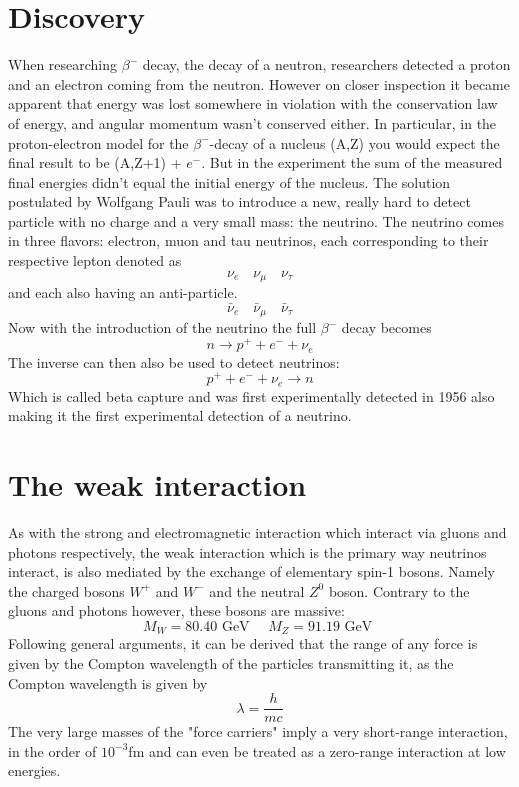 \section{Discovery}
When researching $\beta^-$ decay, the decay of a neutron, researchers
detected a proton and an electron coming from the neutron. However
on closer inspection it became apparent that energy was lost
somewhere in violation with the conservation law of energy, and
angular momentum wasn't conserved either\cite{Bilenky_2012}.  
In particular, in the proton-electron model for the $\beta^-$-decay
of a nucleus (A,Z) you would expect the final result to be (A,Z+1) + $e^-$.
But in the experiment the sum of the measured final energies
didn't equal the initial energy of the nucleus.
The solution postulated by
Wolfgang Pauli was to introduce a new, really hard to detect
particle with no charge and a very small mass: the neutrino.  The neutrino comes in three flavors:
electron, muon and tau neutrinos, each corresponding to their respective lepton denoted as
\begin{equation}
	\nu_e \quad \nu_\mu \quad \nu_\tau
\end{equation}
and each also having an anti-particle.
\begin{equation}
	\bar{\nu}_e \quad \bar{\nu}_\mu \quad \bar{\nu}_\tau
\end{equation}
Now with the introduction of the neutrino the full $\beta^-$ decay
becomes
\begin{equation}
	n \rightarrow p^+ + e^- + \nu_e
\end{equation}
The inverse can then also be used to detect neutrinos:
\begin{equation}
	p^+ + e^- + \nu_e \rightarrow n
\end{equation}
Which is called beta capture and was first experimentally detected in 1956
\cite{BetaCapture} also making it the first experimental detection of a
neutrino.
\section{The weak interaction}
\label{sec:WeakInt}
As with the strong and electromagnetic interaction which interact via gluons
and photons respectively, the weak interaction which is the primary way
neutrinos interact, is also mediated by the exchange of elementary spin-1
bosons.  Namely the charged bosons $W^+$ and $W^-$ and the neutral $Z^0$ boson.
Contrary to the gluons and photons however, these bosons are massive:
\begin{equation}
  M_W = 80.40\text{ GeV }\quad M_Z = 91.19\text{ GeV }
\end{equation}
Following general arguments, it can be derived that the
range of any force is given by the Compton wavelength of the particles transmitting it\cite{martin2017particle},
as the Compton wavelength is given by 
\begin{equation}
  \lambda = \frac{h}{mc}
\end{equation}
The very large masses of the "force carriers" imply a very short-range
interaction, in the order of $10^{-3}$fm and can even be treated as a
zero-range interaction at low energies.

